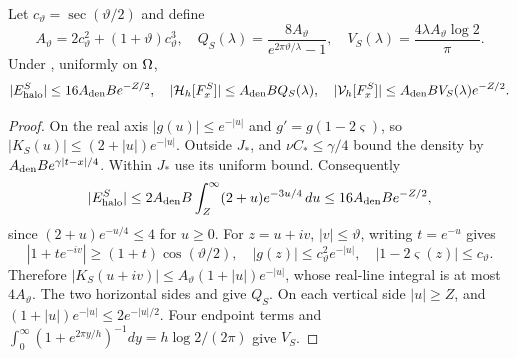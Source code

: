 \begin{proposition}
\label{prop:silu-errors}
Let $c_\vartheta=\sec(\vartheta/2)$ and define
\begin{equation}
 A_\vartheta=2c_\vartheta^2+(1+\vartheta)c_\vartheta^3,
 \quad Q_S(\lambda)=\frac{8A_\vartheta}{e^{2\pi\vartheta/\lambda}-1},
 \quad V_S(\lambda)=\frac{4\lambda A_\vartheta\log2}\pi.
 \label{eq:silu-allowances}
\end{equation}
Under , uniformly on $\Omega$,
\begin{equation}
 |E_{\rm halo}^S|\le16A_{\rm den}B e^{-Z/2},\quad
 |\mathcal H_h[F_x^S]|\le A_{\rm den}B Q_S(\lambda),\quad
 |\mathcal V_h[F_x^S]|\le A_{\rm den}B V_S(\lambda)e^{-Z/2}.
 \label{eq:silu-errors}
\end{equation}
\end{proposition}
\begin{proof}
On the real axis $|g(u)|\le e^{-|u|}$ and
$g'=g(1-2\varsigma)$, so $|K_S(u)|\le(2+|u|)e^{-|u|}$.
Outside $J_*$,  and
$\nu C_*\le\gamma/4$ bound the density by
$A_{\rm den}B e^{\gamma|t-x|/4}$. Within $J_*$ use its uniform bound.
Consequently
\[
 |E_{\rm halo}^S|\le2A_{\rm den}B
 \int_Z^\infty(2+u)e^{-3u/4}\,du
 \le16A_{\rm den}B e^{-Z/2},
\]
since $(2+u)e^{-u/4}\le4$ for $u\ge0$.
For $z=u+iv$, $|v|\le\vartheta$, writing $t=e^{-u}$ gives
\[
 |1+te^{-iv}|\ge(1+t)\cos(\vartheta/2),\quad
 |g(z)|\le c_\vartheta^2e^{-|u|},\quad
 |1-2\varsigma(z)|\le c_\vartheta.
\]
Therefore $|K_S(u+iv)|\le A_\vartheta(1+|u|)e^{-|u|}$, whose real-line
integral is at most $4A_\vartheta$. The two horizontal sides and
 give $Q_S$. On each vertical side $|u|\ge Z$, and
$(1+|u|)e^{-|u|}\le2e^{-|u|/2}$. Four endpoint terms and
$\int_0^\infty(1+e^{2\pi y/h})^{-1}dy=h\log2/(2\pi)$ give $V_S$.
\end{proof}

